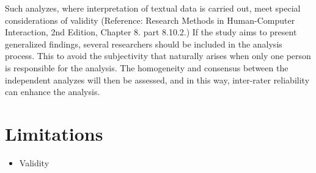 Such analyzes, where interpretation of textual data is carried out, meet special considerations of validity (Reference: Research Methods in Human-Computer Interaction, 2nd Edition, Chapter 8. part 8.10.2.) If the study aims to present generalized findings, several researchers should be included in the analysis process. This to avoid the subjectivity that naturally arises when only one person is responsible for the analysis. The homogeneity and consensus between the independent analyzes will then be assessed, and in this way, inter-rater reliability can enhance the analysis.

\section{Limitations}

     
\begin{itemize}
\item Validity 
\end{itemize}


